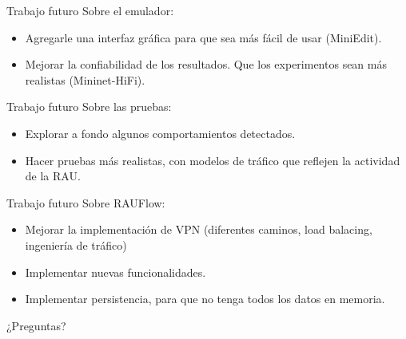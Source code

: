 \documentclass[xcolor=svgnames]{beamer}
\begin{document}
\begin{frame}{Trabajo futuro}
	Sobre el emulador:
	\begin{itemize}
		\item Agregarle una interfaz gráfica para que sea más fácil de usar (MiniEdit).
		\pause
		\item Mejorar la confiabilidad de los resultados. Que los experimentos sean más realistas (Mininet-HiFi).
	\end{itemize}
\end{frame}

\begin{frame}{Trabajo futuro}
	Sobre las pruebas:
	\begin{itemize}
		\item Explorar a fondo algunos comportamientos detectados.
		\pause
		\item Hacer pruebas más realistas, con modelos de tráfico que reflejen la actividad de la RAU.
	\end{itemize}
\end{frame}

\begin{frame}{Trabajo futuro}
	Sobre RAUFlow:
	\begin{itemize}
		\item Mejorar la implementación de VPN (diferentes caminos, load balacing, ingeniería de tráfico)
		\pause
		\item Implementar nuevas funcionalidades.
		\pause
		\item Implementar persistencia, para que no tenga todos los datos en memoria.
	\end{itemize}
\end{frame}

\begin{frame}{}
	\begin{center}
		{\huge ¿Preguntas?}
	\end{center}
\end{frame}
\end{document}
